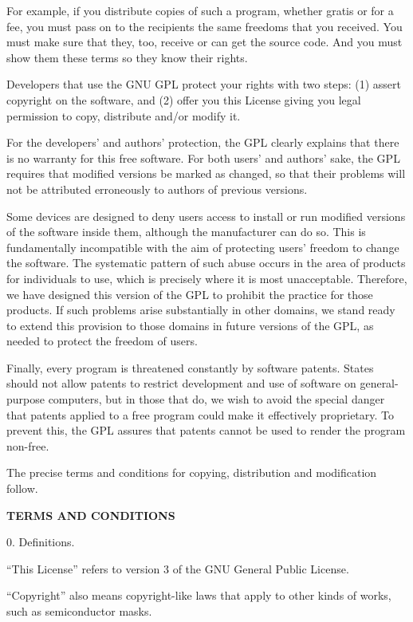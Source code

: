 \documentclass[letterpaper,12pt]{article}
\begin{document}
{For example, if you distribute copies of such a program, whether gratis or for a fee, you must pass on to the recipients the same freedoms that you received. You must make sure that they, too, receive or can get the source code. And you must show them these terms so they know their rights.

Developers that use the GNU GPL protect your rights with two steps: (1) assert copyright on the software, and (2) offer you this License giving you legal permission to copy, distribute and/or modify it.

For the developers' and authors' protection, the GPL clearly explains that there is no warranty for this free software. For both users' and authors' sake, the GPL requires that modified versions be marked as changed, so that their problems will not be attributed erroneously to authors of previous versions.

Some devices are designed to deny users access to install or run modified versions of the software inside them, although the manufacturer can do so. This is fundamentally incompatible with the aim of protecting users' freedom to change the software. The systematic pattern of such abuse occurs in the area of products for individuals to use, which is precisely where it is most unacceptable. Therefore, we have designed this version of the GPL to prohibit the practice for those products. If such problems arise substantially in other domains, we stand ready to extend this provision to those domains in future versions of the GPL, as needed to protect the freedom of users.

Finally, every program is threatened constantly by software patents. States should not allow patents to restrict development and use of software on general-purpose computers, but in those that do, we wish to avoid the special danger that patents applied to a free program could make it effectively proprietary. To prevent this, the GPL assures that patents cannot be used to render the program non-free.

The precise terms and conditions for copying, distribution and modification follow.

\textbf{TERMS AND CONDITIONS}

0. Definitions.

``This License'' refers to version 3 of the GNU General Public License.

``Copyright'' also means copyright-like laws that apply to other kinds of works, such as semiconductor masks.

}
\end{document}
